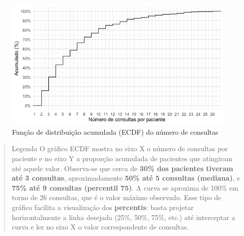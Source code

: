 \documentclass[
]{article}
\begin{document}
\begin{figure}[H]

{\centering \includegraphics[width=1\textwidth,height=\textheight]{outputs/figs/n-consultas-ecdf-1.png}

}

\caption{Função de distribuição acumulada (ECDF) do número de consultas}

\end{figure}%

\begin{quote}
Legenda O gráfico ECDF mostra no eixo X o número de consultas por
paciente e no eixo Y a proporção acumulada de pacientes que atingiram
até aquele valor. Observa-se que cerca de \textbf{30\% dos pacientes
tiveram até 3 consultas}, aproximadamente \textbf{50\% até 5 consultas
(mediana)}, e \textbf{75\% até 9 consultas (percentil 75)}. A curva se
aproxima de 100\% em torno de 26 consultas, que é o valor máximo
observado. Esse tipo de gráfico facilita a visualização dos
\textbf{percentis}: basta projetar horizontalmente a linha desejada
(25\%, 50\%, 75\%, etc.) até interceptar a curva e ler no eixo X o valor
correspondente de consultas.
\end{quote}
\end{document}
